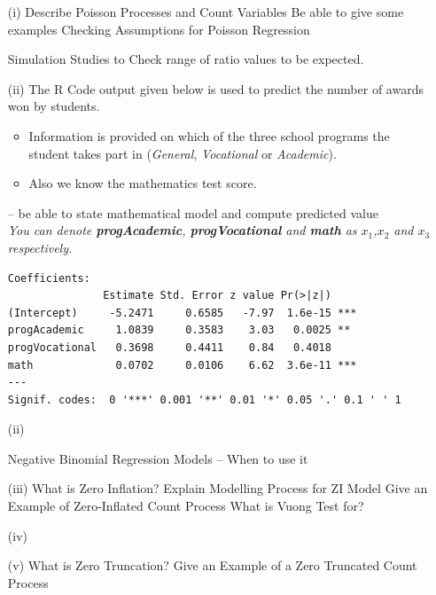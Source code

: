 \documentclass[a4paper,12pt]{article}
\begin{document}
\begin{itemize}
	\item[(i)] 
	Describe Poisson Processes and Count Variables
	Be able to give some examples
	Checking Assumptions for Poisson Regression

	Simulation Studies to Check range of ratio values to be expected.
	
	\item[(ii)] The R Code output given below is used to predict the number of awards won by students. \begin{itemize} 
		\item Information is provided on which of the three school programs the student takes part in (\textit{General}, \textit{Vocational} or \textit{Academic}). 
		\item Also we know the mathematics test score.
		\end{itemize}
		– be able to state mathematical model and compute predicted value
		\\ \textit{You can denote \textbf{progAcademic}, \textbf{progVocational} and \textbf{math} as $x_1$,$x_2$ and $x_3$ respectively.}


\begin{framed}
\begin{verbatim}
Coefficients:
               Estimate Std. Error z value Pr(>|z|)    
(Intercept)     -5.2471     0.6585   -7.97  1.6e-15 ***
progAcademic     1.0839     0.3583    3.03   0.0025 ** 
progVocational   0.3698     0.4411    0.84   0.4018    
math             0.0702     0.0106    6.62  3.6e-11 ***
---
Signif. codes:  0 '***' 0.001 '**' 0.01 '*' 0.05 '.' 0.1 ' ' 1

\end{verbatim}
\end{framed}

	\item[(ii)]

	Negative Binomial Regression Models – When to use it
	
	\item[(iii)] 
		What is Zero Inflation? Explain Modelling Process for ZI Model
		Give an Example of Zero-Inflated Count Process
		What is Vuong Test for?
	
	\item[(iv)] 
	
	\item[(v)] 	What is Zero Truncation? Give an Example of a Zero Truncated Count Process
\end{itemize}
\end{document}
